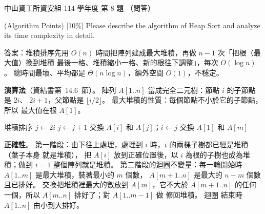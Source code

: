 \begin{pastexam}[label={px:nsysu-114-dmalg-07}]{中山資工所資安組 114 學年度 第 8 題}
（問答）

(Algorithm Points) {[10\%]} Please describe the algorithm of Heap Sort and analyze its time
complexity in detail.
\end{pastexam}

\begin{pastsoln}
答案：堆積排序先用 $O(n)$ 時間把陣列建成最大堆積，再做 $n - 1$ 次「把根（最大值）換到堆積
最後一格、堆積縮小一格、新的根往下調整」，每次 $O(\log n)$。 總時間最壞、平均都是
$\Theta(n \log n)$，額外空間 $O(1)$，不穩定。

\textbf{演算法}（資結書第~14.6~節）。 陣列 $A[1..n]$ 當成完全二元樹：節點 $i$ 的子節點是 $2i$、
$2i + 1$，父節點是 $\lfloor i/2 \rfloor$。 最大堆積的性質：每個節點不小於它的子節點，所以
最大值在根 $A[1]$。
\begin{pseudo}{堆積排序}
 
        \State $j \gets 2i$
            \State $j \gets j + 1$ 
        \EndIf
            \State \Return
        \EndIf
        \State 交換 $A[i]$ 和 $A[j]$；$i \gets j$
    \EndWhile
\EndProcedure
\Statex
{}
     
        \State {}
    \EndFor
     
        \State 交換 $A[1]$ 和 $A[m]$
        \State {}
    \EndFor
\EndProcedure
\end{pseudo}

\textbf{正確性}。 第一階段：由下往上處理，處理到 $i$ 時，$i$ 的兩棵子樹都已經是堆積（葉子本身
就是堆積）， 把 $A[i]$ 放到正確位置後，以 $i$ 為根的子樹也成為堆積；做到 $i = 1$
整個陣列就是堆積。 第二階段的迴圈不變量：每一輪開始時 $A[1..m]$ 是最大堆積，裝著最小的 $m$ 個數，
$A[m+1..n]$ 是最大的 $n - m$ 個數且已排好。 交換把堆積裡最大的數放到 $A[m]$，它不大於
$A[m+1..n]$ 的任何一個，所以 $A[m..n]$ 排好了；對 $A[1..m-1]$ 做  修回堆積。 迴圈
結束時 $A[1..n]$ 由小到大排好。


\end{pastsoln}
